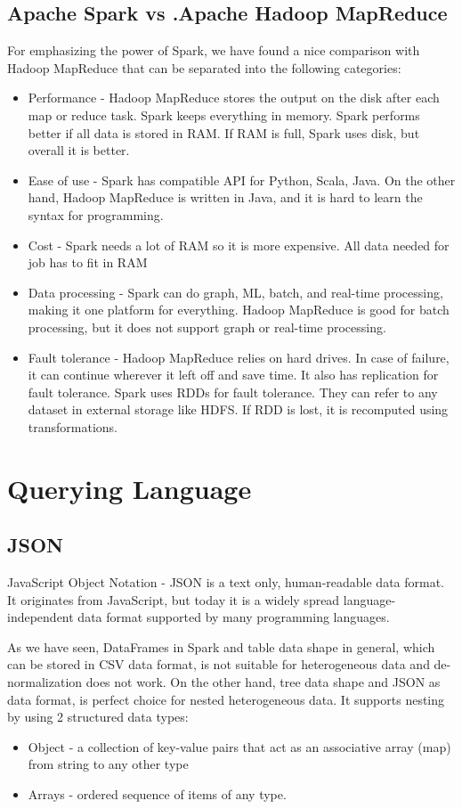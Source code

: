 \subsection{Apache Spark vs .Apache Hadoop MapReduce}
For emphasizing the power of Spark, we have found a nice comparison with Hadoop MapReduce that can be separated into the following categories: 
\begin{itemize}
	\item Performance - Hadoop MapReduce stores the output on the disk after each map or reduce task. Spark keeps everything in memory. Spark performs better if all data is stored in RAM. If RAM is full, Spark uses disk, but overall it is better.
	\item Ease of use - Spark has compatible API for Python, Scala, Java. On the other hand, Hadoop MapReduce is written in Java, and it is hard to learn the syntax for programming. 
	\item Cost - Spark needs a lot of RAM so it is more expensive. All data needed for job has to fit in RAM
	\item Data processing - Spark can do graph, ML, batch, and real-time processing, making it one platform for everything. Hadoop MapReduce is good for batch processing, but it does not support graph or real-time processing. 
	\item Fault tolerance - Hadoop MapReduce relies on hard drives. In case of failure, it can continue wherever it left off and save time. It also has replication for fault tolerance. Spark uses RDDs for fault tolerance. They can refer to any dataset in external storage like HDFS. If RDD is lost, it is recomputed using transformations.
\end{itemize}

\section{Querying Language}
\subsection{JSON}
\label{sec:JSON}
JavaScript Object Notation - JSON \cite{JSON}is a text only, human-readable data format. It originates from JavaScript, but today it is a widely spread language-independent data format supported by many programming languages. 

As we have seen, DataFrames in Spark and table data shape in general, which can be stored in CSV data format, is not suitable for heterogeneous data and de-normalization does not work. On the other hand, tree data shape and JSON as data format, is perfect choice for nested heterogeneous data. It supports nesting by using 2 structured data types:
\begin{itemize}
	\item Object - a collection of key-value pairs that act as an associative array (map) from string to any other type 
	\item Arrays - ordered sequence of items of any type. 
\end{itemize} 

